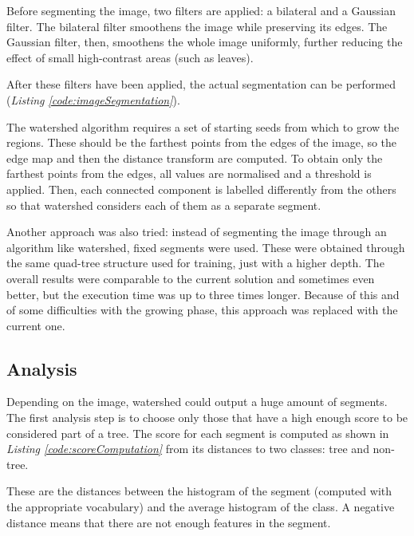 \documentclass{article}
\begin{document}
Before segmenting the image, two filters are applied: a bilateral and a Gaussian filter.
The bilateral filter smoothens the image while preserving its edges. The Gaussian filter, then, smoothens the whole image uniformly, further reducing the effect of small high-contrast areas (such as leaves).

After these filters have been applied, the actual segmentation can be performed (\textit{Listing \ref{code:imageSegmentation}}).



The watershed algorithm requires a set of starting seeds from which to grow the regions. These should be the farthest points from the edges of the image, so the edge map and then the distance transform are computed.
To obtain only the farthest points from the edges, all values are normalised and a threshold is applied.
Then, each connected component is labelled differently from the others so that watershed considers each of them as a separate segment.

Another approach was also tried: instead of segmenting the image through an algorithm like watershed, fixed segments were used. These were obtained through the same quad-tree structure used for training, just with a higher depth. The overall results were comparable to the current solution and sometimes even better, but the execution time was up to three times longer. Because of this and of some difficulties with the growing phase, this approach was replaced with the current one.

\subsection{Analysis}
Depending on the image, watershed could output a huge amount of segments. The first analysis step is to choose only those that have a high enough score to be considered part of a tree.
The score for each segment is computed as shown in \textit{Listing \ref{code:scoreComputation}} from its distances to two classes: tree and non-tree.



These are the distances between the histogram of the segment (computed with the appropriate vocabulary) and the average histogram of the class.
A negative distance means that there are not enough features in the segment.
\end{document}

